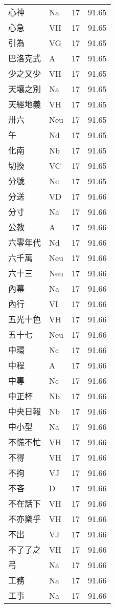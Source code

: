 \documentclass[twocolumn]{book}
\begin{document}
\begin{supertabular}{llrr}
心神 & Na & 17 &  91.65\\
心急 & VH & 17 &  91.65\\
引為 & VG & 17 &  91.65\\
巴洛克式 & A & 17 &  91.65\\
少之又少 & VH & 17 &  91.65\\
天壤之別 & Na & 17 &  91.65\\
天經地義 & VH & 17 &  91.65\\
卅六 & Neu & 17 &  91.65\\
午 & Nd & 17 &  91.65\\
化南 & Nb & 17 &  91.65\\
切換 & VC & 17 &  91.65\\
分號 & Nc & 17 &  91.65\\
分送 & VD & 17 &  91.66\\
分寸 & Na & 17 &  91.66\\
公教 & A & 17 &  91.66\\
六零年代 & Nd & 17 &  91.66\\
六千萬 & Neu & 17 &  91.66\\
六十三 & Neu & 17 &  91.66\\
內幕 & Na & 17 &  91.66\\
內行 & VI & 17 &  91.66\\
五光十色 & VH & 17 &  91.66\\
五十七 & Neu & 17 &  91.66\\
中環 & Nc & 17 &  91.66\\
中程 & A & 17 &  91.66\\
中專 & Nc & 17 &  91.66\\
中正杯 & Nb & 17 &  91.66\\
中央日報 & Nb & 17 &  91.66\\
中小型 & Na & 17 &  91.66\\
不慌不忙 & VH & 17 &  91.66\\
不得 & VH & 17 &  91.66\\
不拘 & VJ & 17 &  91.66\\
不吝 & D & 17 &  91.66\\
不在話下 & VH & 17 &  91.66\\
不亦樂乎 & VH & 17 &  91.66\\
不出 & VJ & 17 &  91.66\\
不了了之 & VH & 17 &  91.66\\
弓 & Na & 17 &  91.66\\
工務 & Na & 17 &  91.66\\
工事 & Na & 17 &  91.66\\

\end{supertabular}
\end{document}
